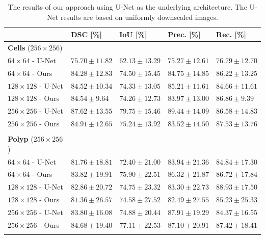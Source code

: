 \begin{table}[t!]
\caption{The results of our approach using U-Net as the underlying architecture. The U-Net results are based on uniformly downscaled images.\label{tab:seg-then-seg-results}}
		\begin{tabularx}{\textwidth}{lCCCC}
			& \textbf{DSC [\%]} & \textbf{IoU [\%]} & \textbf{Prec. [\%]} & \textbf{Rec. [\%]}\\
			\toprule
\toprule
\textbf{Cells} ($256 \times 256$) & & & & \\
\midrule
$64 \times 64$ - U-Net & $75.70 \pm 11.82$ & $62.13 \pm 13.29$ & $75.27 \pm 12.61$ & $76.79 \pm 12.70$ \\
$64 \times 64$ - Ours & $84.28 \pm 12.83$ & $74.50 \pm 15.45$ & $84.75 \pm 14.85$ & $86.22 \pm 13.25$ \\
\midrule
$128 \times 128$ - U-Net & $84.52 \pm 10.34$ & $74.33 \pm 13.05$ & $85.21 \pm 11.61$ & $84.66 \pm 11.61$ \\
$128 \times 128$ - Ours & $84.54 \pm 9.64$ & $74.26 \pm 12.73$ & $83.97 \pm 13.00$ & $86.86 \pm 9.39$ \\
\midrule
$256 \times 256$ - U-Net & $87.62 \pm 13.55$ & $79.75 \pm 15.46$ & $89.44 \pm 14.09$ & $86.58 \pm 14.83$ \\
$256 \times 256$ - Ours & $84.91 \pm 12.65$ & $75.24 \pm 13.92$ & $83.52 \pm 14.50$ & $87.53 \pm 13.76$ \\
\bottomrule \\
\toprule
\textbf{Polyp} ($256 \times 256$) & & & & \\
\midrule
$64 \times 64$ - U-Net & $81.76 \pm 18.81$ & $72.40 \pm 21.00$ & $83.94 \pm 21.36$ & $84.84 \pm 17.30$ \\
$64 \times 64$ - Ours & $83.82 \pm 19.91$ & $75.90 \pm 22.51$ & $86.32 \pm 21.87$ & $86.72 \pm 17.84$ \\
\midrule
$128 \times 128$ - U-Net & $82.86 \pm 20.72$ & $74.75 \pm 23.32$ & $83.30 \pm 22.73$ & $88.93 \pm 17.50$ \\
$128 \times 128$ - Ours & $81.36 \pm 26.57$ & $74.58 \pm 27.52$ & $82.49 \pm 27.55$ & $85.23 \pm 25.33$ \\
\midrule
$256 \times 256$ - U-Net & $83.80 \pm 16.08$ & $74.88 \pm 20.44$ & $87.91 \pm 19.29$ & $84.37 \pm 16.55$ \\
$256 \times 256$ - Ours & $84.68 \pm 19.40$ & $77.11 \pm 22.53$ & $87.10 \pm 20.91$ & $87.42 \pm 18.41$ \\
\bottomrule \\

\end{tabularx}
\end{table}

